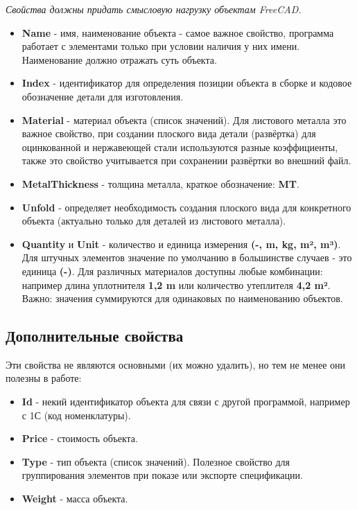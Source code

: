\documentclass[a4paper,12pt]{article}
\begin{document}
\begin{center}\emph{Свойства должны придать смысловую нагрузку объектам FreeCAD.}\end{center}

\begin{itemize}
	\item \textbf{Name} - имя, наименование объекта - самое важное свойство, программа работает с элементами только при условии наличия у них имени. Наименование должно отражать суть объекта.
	\item \textbf{Index} - идентификатор для определения позиции объекта в сборке и кодовое обозначение детали для изготовления.
	\item \textbf{Material} - материал объекта (список значений). Для листового металла это важное свойство, при создании плоского вида детали (развёртка) для оцинкованной и нержавеющей стали используются разные коэффициенты, также это свойство учитывается при сохранении развёртки во внешний файл.
	\item \textbf{MetalThickness} - толщина металла, краткое обозначение: \textbf{MT}.
	\item \textbf{Unfold} - определяет необходимость создания плоского вида для конкретного объекта (актуально только для деталей из листового металла).
	\item \textbf{Quantity} и \textbf{Unit} - количество и единица измерения \textbf{(-, m, kg, m², m³)}. Для штучных элементов значение по умолчанию в большинстве случаев - это единица \textbf{(-)}. Для различных материалов доступны любые комбинации: например длина уплотнителя \textbf{1,2 m} или количество утеплителя \textbf{4,2 m²}. Важно: значения суммируются для одинаковых по наименованию объектов.
\end{itemize}

\pagebreak

\subsection{Дополнительные свойства}
Эти свойства не являются основными (их можно удалить), но тем не менее они полезны в работе:

\begin{itemize}
	\item \textbf{Id} - некий идентификатор объекта для связи с другой программой, например с 1С (код номенклатуры).
	\item \textbf{Price} - стоимость объекта.
	\item \textbf{Type} - тип объекта (список значений). Полезное свойство для группирования элементов при показе или экспорте спецификации.
	\item \textbf{Weight} - масса объекта.
\end{itemize}
\end{document}
